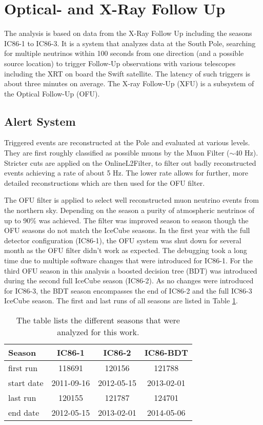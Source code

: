 \section{Optical- and X-Ray Follow Up}
\label{sec:OFU}
The analysis is based on data from the X-Ray Follow Up including the seasons 
IC86-1 to IC86-3. It is a system that analyzes data at the South Pole, 
searching for multiple neutrinos within 100 seconds from one direction (and a 
possible source 
location) to trigger Follow-Up observations with various telescopes including 
the XRT on board the Swift satellite. The latency of such triggers is about 
three minutes on average. The X-ray Follow-Up (XFU) is a subsystem of the 
Optical Follow-Up (OFU).

\subsection{Alert System}
\label{sec:OFU_alert_system}

Triggered events are reconstructed at the Pole and evaluated at various levels. 
They are first roughly classified as possible muons by the Muon Filter 
($\sim$40 Hz). Stricter cuts are applied on the OnlineL2Filter, to filter 
out badly reconstructed events achieving a rate of about 5 Hz. The lower rate 
allows for further, more detailed reconstructions which are then used for the 
OFU filter. 

The OFU filter is applied to select well reconstructed muon neutrino events 
from the northern sky. Depending on the season a purity of atmospheric 
neutrinos of up to 90\% was 
achieved. The filter was improved season to season though the OFU seasons do 
not match the IceCube seasons. In the first year with the full detector 
configuration (IC86-1), the OFU system was shut down for several month as the 
OFU filter didn't work as expected. The debugging took a long time due to 
multiple software changes that were introduced for IC86-1. For the third OFU 
season in this analysis a boosted decision tree (BDT) was introduced during the 
second full IceCube season (IC86-2). As no changes were introduced for IC86-3, 
the BDT season encompasses the end of IC86-2 and the full IC86-3 IceCube 
season. The first and last runs of all seasons are listed in Table 
\ref{tab:ofu_seasons}.

\begin{table}[h]
  \centering
  \begin{tabular}{l||c|c|c}
   Season & IC86-1 & IC86-2 & IC86-BDT \\
\hline
   first run & 118691  & 120156  & 121788  \\
   start date & 2011-09-16 & 2012-05-15 & 2013-02-01\\
\hline
   last run  & 120155 & 121787 & 124701 \\
   end date & 2012-05-15  & 2013-02-01 & 2014-05-06 \\
  \end{tabular}
  \caption{The table lists the different seasons that were analyzed for this 
work.}
  \label{tab:ofu_seasons}
\end{table}

